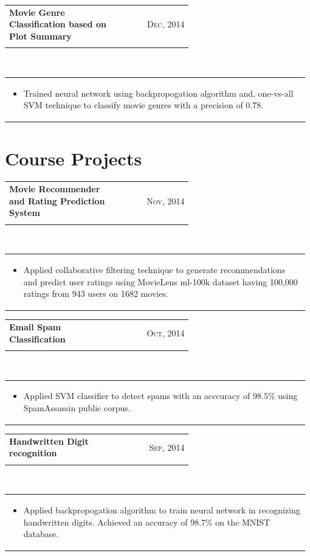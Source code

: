\documentclass[a4paper]{article} %
\newcommand{\verticalspacing}{-0.25cm}
\newcommand{\bulletspace}{0.7cm}
\newcommand{\projectheadspacing}{6.9cm}
\newcommand{\cproject}[5]{%
    \begin{tabular}{p{0.60\linewidth}r}
        \textcolor{smokyblack}{\small #2} & \multicolumn{1}{m{ \projectheadspacing{} }}{\raggedleft \small {\textsc{#1}}}\\
        \textcolor{payne\'sgrey}{\small #3} & \small {#4}
    \end{tabular}\\
    \begin{tabular}{p{0.98\linewidth}}
    \vspace{-0.3cm}
        \small{#5}
    \end{tabular}
    \vspace{\verticalspacing{}}
}
\begin{document}
\cproject
    {Dec, 2014}
    {\textbf{Movie Genre Classification based on Plot Summary}}
    {\textsc{\raggedright Minor Project}}
    {}
    {%
        \begin{itemize}[leftmargin=\bulletspace{}]
            \item Trained neural network  using backpropogation algorithm and, one-vs-all SVM technique to classify movie genres with a precision of 0.78.
        \end{itemize}
    }
    
\section{Course Projects}
\cproject
    {Nov, 2014}
    {\textbf{Movie Recommender and Rating Prediction System}}
    {\textsc{\raggedright Machine Learning Course}}
    {}
    {%
        \begin{itemize}[leftmargin=\bulletspace{}]
            \item Applied collaborative filtering technique to generate recommendations and predict user ratings using MovieLens ml-100k dataset having 100,000 ratings from 943 users on 1682 movies.
        \end{itemize}
    }
    
\cproject
    {Oct, 2014}
    {\textbf{Email Spam Classification}}
    {\textsc{\raggedright Machine Learning Course}}
    {}
    {%
        \begin{itemize}[leftmargin=\bulletspace{}]
        	   \item Applied SVM classifier to detect spams with an acccuracy of 98.5\% using SpamAssassin public corpus.
        \end{itemize}
    }
    
\cproject
    {Sep, 2014}
    {\textbf{Handwritten Digit recognition}}
    {\textsc{\raggedright Machine Learning Course}}
	{}
    {%
        \begin{itemize}[leftmargin=\bulletspace{}]
            \item Applied backpropogation algorithm to train neural network in recognizing handwritten digits. Achieved an accuracy of 98.7\% on the MNIST database.
        \end{itemize}
    }


\end{document}
